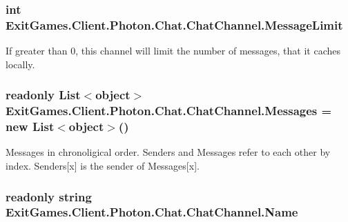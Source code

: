 \subsubsection[{\texorpdfstring{Message\+Limit}{MessageLimit}}]{\setlength{\rightskip}{0pt plus 5cm}int Exit\+Games.\+Client.\+Photon.\+Chat.\+Chat\+Channel.\+Message\+Limit}\hypertarget{class_exit_games_1_1_client_1_1_photon_1_1_chat_1_1_chat_channel_a647d38d28697bcb1c6600520130d4cbf}{}\label{class_exit_games_1_1_client_1_1_photon_1_1_chat_1_1_chat_channel_a647d38d28697bcb1c6600520130d4cbf}


If greater than 0, this channel will limit the number of messages, that it caches locally.

\subsubsection[{\texorpdfstring{Messages}{Messages}}]{\setlength{\rightskip}{0pt plus 5cm}readonly List$<$object$>$ Exit\+Games.\+Client.\+Photon.\+Chat.\+Chat\+Channel.\+Messages = new List$<$object$>$()}\hypertarget{class_exit_games_1_1_client_1_1_photon_1_1_chat_1_1_chat_channel_a6ed4416ea6c6778dd857c95f3276a005}{}\label{class_exit_games_1_1_client_1_1_photon_1_1_chat_1_1_chat_channel_a6ed4416ea6c6778dd857c95f3276a005}


Messages in chronoligical order. Senders and Messages refer to each other by index. Senders\mbox{[}x\mbox{]} is the sender of Messages\mbox{[}x\mbox{]}.

\subsubsection[{\texorpdfstring{Name}{Name}}]{\setlength{\rightskip}{0pt plus 5cm}readonly string Exit\+Games.\+Client.\+Photon.\+Chat.\+Chat\+Channel.\+Name}\hypertarget{class_exit_games_1_1_client_1_1_photon_1_1_chat_1_1_chat_channel_ad5488b697206375ef6b13d4fa33eafdf}{}\label{class_exit_games_1_1_client_1_1_photon_1_1_chat_1_1_chat_channel_ad5488b697206375ef6b13d4fa33eafdf}


